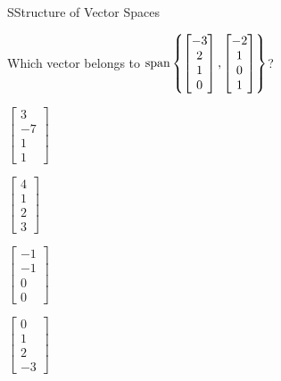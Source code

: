 \documentclass{article}[12pt]
\begin{document}
\begin{module}{S}{Structure of Vector Spaces}
\begin{readinessAssuranceTest}
  \item Which vector belongs to \(\operatorname{span}\left\{
  \begin{bmatrix}
    -3 \\ 2 \\ 1 \\ 0
  \end{bmatrix},
  \begin{bmatrix}
    -2 \\ 1 \\ 0 \\ 1
  \end{bmatrix}
  \right\}\)?
    \begin{multicols}{4}
    \begin{readinessAssuranceTestChoices}
      \item \(
      \begin{bmatrix}
        3 \\ -7 \\ 1 \\ 1
      \end{bmatrix}
      \)
      \item \(
      \begin{bmatrix}
        4 \\ 1 \\ 2 \\ 3
      \end{bmatrix}
      \)
      \item \(
      \begin{bmatrix}
        -1 \\ -1 \\ 0 \\ 0
      \end{bmatrix}
      \)
      \item \(
      \begin{bmatrix}
        0 \\ 1 \\ 2 \\ -3
      \end{bmatrix}
      \) %
    \end{readinessAssuranceTestChoices}
    \end{multicols}



\end{readinessAssuranceTest}
\end{module}
\end{document}
